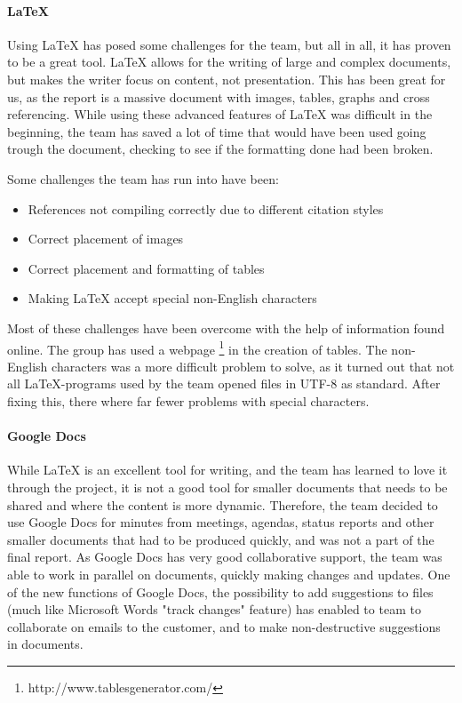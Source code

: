 \documentclass[11pt,a4paper,titlepage,oneside]{report}
\begin{document}
\paragraph{\LaTeX}
Using \LaTeX{} has posed some challenges for the team, but all in all, it has proven to be a great tool. \LaTeX{} allows for the writing of large and complex documents, but makes the writer focus on content, not presentation. This has been great for us, as the report is a massive document with images, tables, graphs and cross referencing. While using these advanced features of \LaTeX{} was difficult in the beginning, the team has saved a lot of time that would have been used going trough the document, checking to see if the formatting done had been broken. 

Some challenges the team has run into have been:
\begin{itemize}
\item References not compiling correctly due to different citation styles
\item Correct placement of images
\item Correct placement and formatting of tables
\item Making LaTeX accept special non-English characters
\end{itemize}

Most of these challenges have been overcome with the help of information found online. The group has used a webpage \footnote{http://www.tablesgenerator.com/} in the creation of tables. The non-English characters was a more difficult problem to solve, as it turned out that not all \LaTeX-programs used by the team opened files in UTF-8 as standard. After fixing this, there where far fewer problems with special characters.

\paragraph{Google Docs}
While \LaTeX{} is an excellent tool for writing, and the team has learned to love it through the project, it is not a good tool for smaller documents that needs to be shared and where the content is more dynamic. Therefore, the team decided to use Google Docs for minutes from meetings, agendas, status reports and other smaller documents that had to be produced quickly, and was not a part of the final report. As Google Docs has very good collaborative support, the team was able to work in parallel on documents, quickly making changes and updates. One of the new functions of Google Docs, the possibility to add suggestions to files (much like Microsoft Words "track changes" feature) has enabled to team to collaborate on emails to the customer, and to make non-destructive suggestions in documents.
\end{document}
